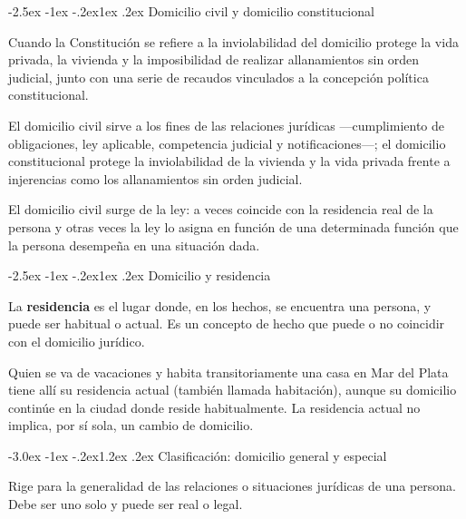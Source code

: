 \documentclass[12pt,oneside]{book}
\makeatletter
\renewcommand\section{\@startsection{section}{1}{\z@}%
  {-3.0ex \@plus -1ex \@minus -.2ex}{1.2ex \@plus .2ex}%
  {\normalfont\large\bfseries\color{acento}}}
\renewcommand\subsection{\@startsection{subsection}{2}{\z@}%
  {-2.5ex \@plus -1ex \@minus -.2ex}{1ex \@plus .2ex}%
  {\normalfont\normalsize\bfseries}}
\makeatother
\begin{document}
\subsection{Domicilio civil y domicilio constitucional}

Cuando la Constitución se refiere a la inviolabilidad del domicilio protege la vida privada, la vivienda y la imposibilidad de realizar allanamientos sin orden judicial, junto con una serie de recaudos vinculados a la concepción política constitucional.

\begin{importante}
El domicilio civil sirve a los fines de las relaciones jurídicas ---cumplimiento de obligaciones, ley aplicable, competencia judicial y notificaciones---; el domicilio constitucional protege la inviolabilidad de la vivienda y la vida privada frente a injerencias como los allanamientos sin orden judicial.
\end{importante}

El domicilio civil surge de la ley: a veces coincide con la residencia real de la persona y otras veces la ley lo asigna en función de una determinada función que la persona desempeña en una situación dada.

\subsection{Domicilio y residencia}

La \textbf{residencia} es el lugar donde, en los hechos, se encuentra una persona, y puede ser habitual o actual. Es un concepto de hecho que puede o no coincidir con el domicilio jurídico.

\begin{ejemplo}
Quien se va de vacaciones y habita transitoriamente una casa en Mar del Plata tiene allí su residencia actual (también llamada habitación), aunque su domicilio continúe en la ciudad donde reside habitualmente. La residencia actual no implica, por sí sola, un cambio de domicilio.
\end{ejemplo}

\section{Clasificación: domicilio general y especial}

\begin{definicion}
Rige para la generalidad de las relaciones o situaciones jurídicas de una persona. Debe ser uno solo y puede ser real o legal.
\end{definicion}
\end{document}
